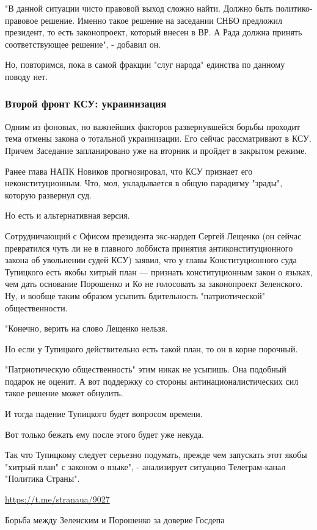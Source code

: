 "В данной ситуации чисто правовой выход сложно найти. Должно быть
политико-правовое решение. Именно такое решение на заседании СНБО предложил
президент, то есть законопроект, который внесен в ВР. А Рада должна принять
соответствующее решение", - добавил он.

Но, повторимся, пока в самой фракции "слуг народа" единства по данному поводу
нет.

\subsubsection{Второй фронт КСУ: украинизация}

Одним из фоновых, но важнейших факторов развернувшейся борьбы проходит тема
отмены закона о тотальной украинизации. Его сейчас рассматривают в КСУ. Причем
Заседание запланировано уже на вторник и пройдет в закрытом режиме. 

Ранее глава НАПК Новиков прогнозировал, что КСУ признает его неконституционным.
Что, мол, укладывается в общую парадигму "зрады", которую развернул суд. 

Но есть и альтернативная версия.

Сотрудничающий с Офисом президента экс-нардеп Сергей Лещенко (он сейчас
превратился чуть ли не в главного лоббиста принятия антиконституционного закона
об увольнении судей КСУ) заявил, что у главы Конституционного суда Тупицкого
есть якобы хитрый план --- признать конституционным закон о языках, чем дать
основание Порошенко и Ко не голосовать за законопроект Зеленского. Ну, и вообще
таким образом усыпить бдительность "патриотической" общественности.

"Конечно, верить на слово Лещенко нельзя.

Но если у Тупицкого действительно есть такой план, то он в корне порочный.

"Патриотическую общественность" этим никак не усыпишь. Она подобный подарок не
оценит. А вот поддержку со стороны антинационалистических сил такое решение
может обнулить.

И тогда падение Тупицкого будет вопросом времени.

Вот только бежать ему после этого будет уже некуда.

Так что Тупицкому следует серьезно подумать, прежде чем запускать этот якобы
"хитрый план" с законом о языке", - анализирует ситуацию Телеграм-канал
"Политика Страны".

\url{https://t.me/stranaua/9027}

Борьба между Зеленским и Порошенко за доверие Госдепа

